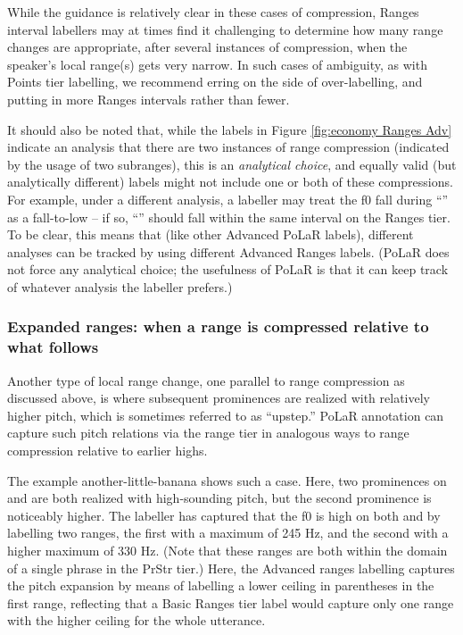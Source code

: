 While the guidance is relatively clear in these cases of compression, Ranges interval labellers may at times find it challenging to determine how many range changes are appropriate, after several instances of compression, when the speaker’s local range(s) gets very narrow. In such cases of ambiguity, as with Points tier labelling, we recommend erring on the side of over-labelling, and putting in more Ranges intervals rather than fewer.

It should also be noted that, while the labels in Figure \ref{fig:economy Ranges Adv} indicate an analysis that there are two instances of range compression (indicated by the usage of two subranges), this is an \emph{analytical choice}, and equally valid (but analytically different) labels might not include one or both of these compressions. For example, under a different analysis, a labeller may treat the f0 fall during “” as a fall-to-low – if so, “” should fall within the same interval on the Ranges tier. To be clear, this means that (like other Advanced PoLaR labels), different analyses can be tracked by using different Advanced Ranges labels. (PoLaR does not force any analytical choice; the usefulness of PoLaR is that it can keep track of whatever analysis the labeller prefers.)

\subsubsection{Expanded ranges: when a range is compressed relative to what follows}\label{sec:expanded-ranges-when-a-range-is-compressed-relative-to-what-follows}

Another type of local range change, one parallel to range compression as discussed above, is where subsequent prominences are realized with relatively higher pitch, which is sometimes referred to as “upstep.” PoLaR annotation can capture such pitch relations via the range tier in analogous ways to range compression relative to earlier highs.

The example another-little-banana shows such a case. Here, two prominences on  and  are both realized with high-sounding pitch, but the second prominence is noticeably higher. The labeller has captured that the f0 is high on both  and  by labelling two ranges, the first with a maximum of 245 Hz, and the second with a higher maximum of 330 Hz. (Note that these ranges are both within the domain of a single phrase in the PrStr tier.) Here, the Advanced ranges labelling captures the pitch expansion by means of labelling a lower ceiling in parentheses in the first range, reflecting that a Basic Ranges tier label would capture only one range with the higher ceiling for the whole utterance.

